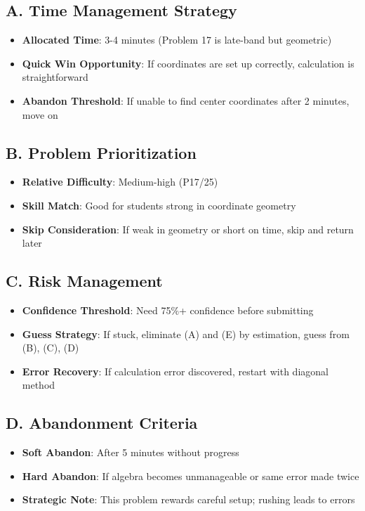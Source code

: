 \documentclass[]{article}
\begin{document}
\begin{competitionbox}
\subsection*{A. Time Management Strategy}
\begin{itemize}[leftmargin=*]
    \item \textbf{Allocated Time}: 3-4 minutes (Problem 17 is late-band but geometric)
    \item \textbf{Quick Win Opportunity}: If coordinates are set up correctly, calculation is straightforward
    \item \textbf{Abandon Threshold}: If unable to find center coordinates after 2 minutes, move on
\end{itemize}

\subsection*{B. Problem Prioritization}
\begin{itemize}[leftmargin=*]
    \item \textbf{Relative Difficulty}: Medium-high (P17/25)
    \item \textbf{Skill Match}: Good for students strong in coordinate geometry
    \item \textbf{Skip Consideration}: If weak in geometry or short on time, skip and return later
\end{itemize}

\subsection*{C. Risk Management}
\begin{itemize}[leftmargin=*]
    \item \textbf{Confidence Threshold}: Need 75\%+ confidence before submitting
    \item \textbf{Guess Strategy}: If stuck, eliminate (A) and (E) by estimation, guess from (B), (C), (D)
    \item \textbf{Error Recovery}: If calculation error discovered, restart with diagonal method
\end{itemize}

\subsection*{D. Abandonment Criteria}
\begin{itemize}[leftmargin=*]
    \item \textbf{Soft Abandon}: After 5 minutes without progress
    \item \textbf{Hard Abandon}: If algebra becomes unmanageable or same error made twice
    \item \textbf{Strategic Note}: This problem rewards careful setup; rushing leads to errors
\end{itemize}
\end{competitionbox}
\end{document}
